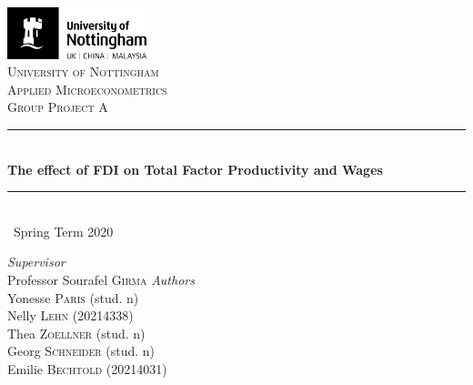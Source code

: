 \documentclass[a4paper,11pt]{scrartcl}
\newcommand{\sectionnumbering}[1]{%
  \setcounter{section}{0}%
   \renewcommand{\thesection}{\csname #1\endcsname{section}}}
\begin{document}
	\begin{titlepage}
		\newcommand{\HRule}{\rule{\linewidth}{0.5mm}}
		
	\vfill\vfill
	\includegraphics[height=1.5cm]{UoN_Logo}\\[1cm] 


	\center			
	\textsc{\LARGE University of Nottingham}\\[1.5cm] 
	\textsc{\Large Applied Microeconometrics}\\[0.5cm] 	
	\textsc{\large Group Project A}\\[0.5cm] 
	
	\HRule\\[0.4cm]
	{\huge\bfseries The effect of FDI on Total Factor Productivity and Wages}\\[0.4cm] 
	\HRule\\[0.4cm]
	
	{\large\ Spring Term 2020} 	
	\vfill\vfill\vfill 		
	
\begin{flushleft}
			\large
			\textit{Supervisor}\\
			Professor Sourafel \textsc{Girma} 
			\vfill\vfill 
			\textit{Authors}\\
			Yonesse \textsc{Paris} (stud. n)\\
			Nelly  \textsc{Lehn} (20214338)\\
			Thea  \textsc{Zoellner} (stud. n)\\
			Georg  \textsc{Schneider} (stud. n)\\
			Emilie \textsc{Bechtold} (20214031)
		\end{flushleft}
	\vfill 
	
\end{titlepage}


\sectionnumbering{Roman}
\tableofcontents

\newpage

\listoftables
\newpage

\sectionnumbering{arabic}
\end{document}
